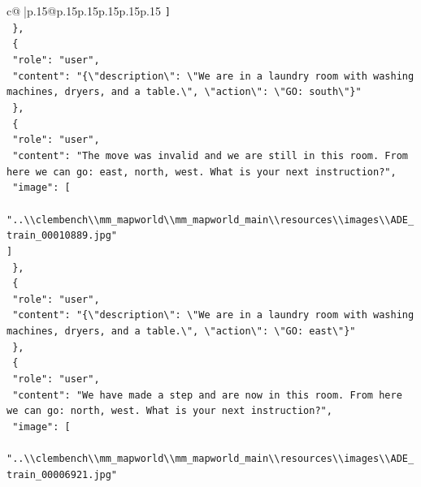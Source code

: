 \documentclass{article}
\begin{document}
{\begin{supertabular}{c@{$\;$}|p{.15\linewidth}@{}p{.15\linewidth}p{.15\linewidth}p{.15\linewidth}p{.15\linewidth}p{.15\linewidth}}
{{{\texttt{    {]}} \\
\texttt{  \},} \\
\texttt{  \{} \\
\texttt{    "role": "user",} \\
\texttt{    "content": "\{\textbackslash{}"description\textbackslash{}": \textbackslash{}"We are in a laundry room with washing machines, dryers, and a table.\textbackslash{}", \textbackslash{}"action\textbackslash{}": \textbackslash{}"GO: south\textbackslash{}"\}"} \\
\texttt{  \},} \\
\texttt{  \{} \\
\texttt{    "role": "user",} \\
\texttt{    "content": "The move was invalid and we are still in this room. From here we can go: east, north, west. What is your next instruction?",} \\
\texttt{    "image": {[}} \\
\texttt{      "..\textbackslash{}\textbackslash{}clembench\textbackslash{}\textbackslash{}mm\_mapworld\textbackslash{}\textbackslash{}mm\_mapworld\_main\textbackslash{}\textbackslash{}resources\textbackslash{}\textbackslash{}images\textbackslash{}\textbackslash{}ADE\_train\_00010889.jpg"} \\
\texttt{    {]}} \\
\texttt{  \},} \\
\texttt{  \{} \\
\texttt{    "role": "user",} \\
\texttt{    "content": "\{\textbackslash{}"description\textbackslash{}": \textbackslash{}"We are in a laundry room with washing machines, dryers, and a table.\textbackslash{}", \textbackslash{}"action\textbackslash{}": \textbackslash{}"GO: east\textbackslash{}"\}"} \\
\texttt{  \},} \\
\texttt{  \{} \\
\texttt{    "role": "user",} \\
\texttt{    "content": "We have made a step and are now in this room. From here we can go: north, west. What is your next instruction?",} \\
\texttt{    "image": {[}} \\
\texttt{      "..\textbackslash{}\textbackslash{}clembench\textbackslash{}\textbackslash{}mm\_mapworld\textbackslash{}\textbackslash{}mm\_mapworld\_main\textbackslash{}\textbackslash{}resources\textbackslash{}\textbackslash{}images\textbackslash{}\textbackslash{}ADE\_train\_00006921.jpg"} \\
}}}
\end{supertabular}}
\end{document}

